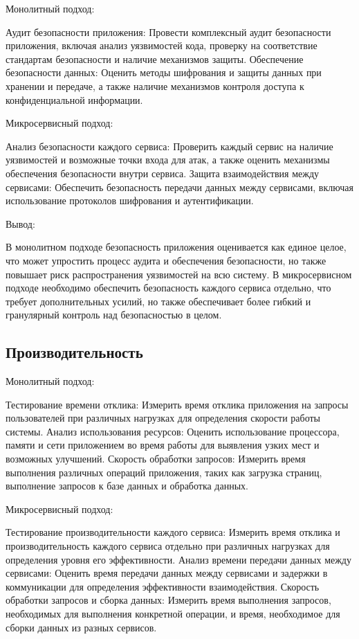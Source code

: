 Монолитный подход:

    Аудит безопасности приложения: Провести комплексный аудит безопасности приложения, включая анализ уязвимостей кода, проверку на соответствие стандартам безопасности и наличие механизмов защиты.
    Обеспечение безопасности данных: Оценить методы шифрования и защиты данных при хранении и передаче, а также наличие механизмов контроля доступа к конфиденциальной информации.

Микросервисный подход:

    Анализ безопасности каждого сервиса: Проверить каждый сервис на наличие уязвимостей и возможные точки входа для атак, а также оценить механизмы обеспечения безопасности внутри сервиса.
    Защита взаимодействия между сервисами: Обеспечить безопасность передачи данных между сервисами, включая использование протоколов шифрования и аутентификации.

Вывод:

    В монолитном подходе безопасность приложения оценивается как единое целое, что может упростить процесс аудита и обеспечения безопасности, но также повышает риск распространения уязвимостей на всю систему.
    В микросервисном подходе необходимо обеспечить безопасность каждого сервиса отдельно, что требует дополнительных усилий, но также обеспечивает более гибкий и гранулярный контроль над безопасностью в целом.

\subsection{Производительность}

Монолитный подход:

    Тестирование времени отклика: Измерить время отклика приложения на запросы пользователей при различных нагрузках для определения скорости работы системы.
    Анализ использования ресурсов: Оценить использование процессора, памяти и сети приложением во время работы для выявления узких мест и возможных улучшений.
    Скорость обработки запросов: Измерить время выполнения различных операций приложения, таких как загрузка страниц, выполнение запросов к базе данных и обработка данных.

Микросервисный подход:

    Тестирование производительности каждого сервиса: Измерить время отклика и производительность каждого сервиса отдельно при различных нагрузках для определения уровня его эффективности.
    Анализ времени передачи данных между сервисами: Оценить время передачи данных между сервисами и задержки в коммуникации для определения эффективности взаимодействия.
    Скорость обработки запросов и сборка данных: Измерить время выполнения запросов, необходимых для выполнения конкретной операции, и время, необходимое для сборки данных из разных сервисов.

